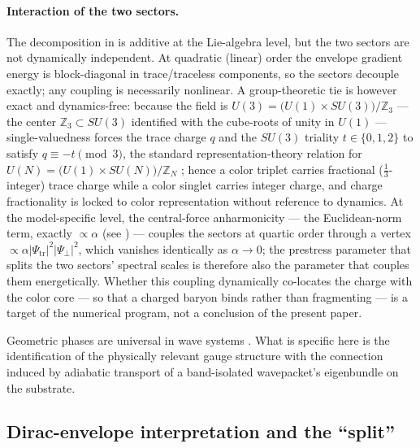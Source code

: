 \paragraph{Interaction of the two sectors.}
The decomposition in  is additive at the Lie-algebra level, but the two sectors are not dynamically independent.
At quadratic (linear) order the envelope gradient energy is block-diagonal in trace/traceless components, so the sectors decouple exactly; any coupling is necessarily nonlinear.
A group-theoretic tie is however exact and dynamics-free: because the field is $U(3)=\bigl(U(1)\times SU(3)\bigr)/\mathbb{Z}_3$ --- the center $\mathbb{Z}_3\subset SU(3)$ identified with the cube-roots of unity in $U(1)$ --- single-valuedness forces the trace charge $q$ and the $SU(3)$ triality $t\in\{0,1,2\}$ to satisfy $q\equiv -t\pmod{3}$, the standard representation-theory relation for $U(N)=\bigl(U(1)\times SU(N)\bigr)/\mathbb{Z}_N$ \citep{GeorgiGlashow1974,BaezHuerta2010GUTAlgebra}; hence a color triplet carries fractional ($\tfrac{1}{3}$-integer) trace charge while a color singlet carries integer charge, and charge fractionality is locked to color representation without reference to dynamics.
At the model-specific level, the central-force anharmonicity --- the Euclidean-norm term, exactly $\propto\alpha$ (see ) --- couples the sectors at quartic order through a vertex $\propto\alpha|\Psi_{\mathrm{tr}}|^2|\Psi_\perp|^2$, which vanishes identically as $\alpha\to 0$; the prestress parameter that splits the two sectors' spectral scales is therefore also the parameter that couples them energetically.
Whether this coupling dynamically co-locates the charge with the color core --- so that a charged baryon binds rather than fragmenting --- is a target of the numerical program, not a conclusion of the present paper.

Geometric phases are universal in wave systems \citep{Pancharatnam1956,Berry1984,WilczekZee1984,Bliokh2015SpinOrbit,Cisowski2022}.
What is specific here is the identification of the physically relevant gauge structure with the
connection induced by adiabatic transport of a band-isolated wavepacket's eigenbundle on the substrate.

\subsection{Dirac-envelope interpretation and the ``split''}


